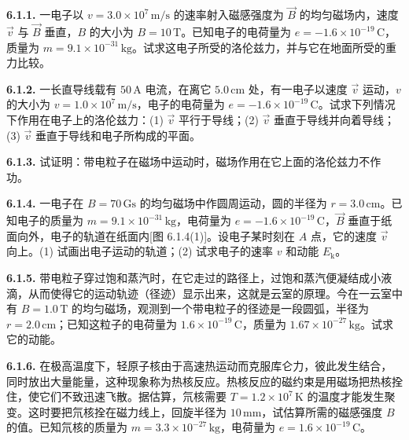 \textbf{6.1.1.} 一电子以 $v = 3.0 \times 10^{7}\,\mathrm{m/s}$ 的速率射入磁感强度为 $\vec{B}$ 的均匀磁场内，速度 $\vec{v}$ 与 $\vec{B}$ 垂直，$B$ 的大小为 $B = 10\,\mathrm{T}$。已知电子的电荷量为 $e = -1.6 \times 10^{-19}\,\mathrm{C}$，质量为 $m = 9.1 \times 10^{-31}\,\mathrm{kg}$。试求这电子所受的洛伦兹力，并与它在地面所受的重力比较。

\vfill
\newpage

\textbf{6.1.2.} 一长直导线载有 $50\,\mathrm{A}$ 电流，在离它 $5.0\,\mathrm{cm}$ 处，有一电子以速度 $\vec{v}$ 运动，$v$ 的大小为 $v = 1.0 \times 10^{7}\,\mathrm{m/s}$，电子的电荷量为 $e = -1.6 \times 10^{-19}\,\mathrm{C}$。试求下列情况下作用在电子上的洛伦兹力：(1) $\vec{v}$ 平行于导线；(2) $\vec{v}$ 垂直于导线并向着导线；(3) $\vec{v}$ 垂直于导线和电子所构成的平面。

\vfill
\newpage

\textbf{6.1.3.} 试证明：带电粒子在磁场中运动时，磁场作用在它上面的洛伦兹力不作功。

\vfill
\newpage

\textbf{6.1.4.} 一电子在 $B = 70\,\mathrm{Gs}$ 的均匀磁场中作圆周运动，圆的半径为 $r = 3.0\,\mathrm{cm}$。已知电子的质量为 $m = 9.1 \times 10^{-31}\,\mathrm{kg}$，电荷量为 $e = -1.6 \times 10^{-19}\,\mathrm{C}$，$\vec{B}$ 垂直于纸面向外，电子的轨道在纸面内[图 6.1.4(1)]。设电子某时刻在 $A$ 点，它的速度 $\vec{v}$ 向上。(1) 试画出电子运动的轨道；(2) 试求电子的速率 $v$ 和动能 $E_{\mathrm{k}}$。

\begin{center}
\end{center}

\vfill
\newpage

\textbf{6.1.5.} 带电粒子穿过饱和蒸汽时，在它走过的路径上，过饱和蒸汽便凝结成小液滴，从而使得它的运动轨迹（径迹）显示出来，这就是云室的原理。今在一云室中有 $B = 1.0\,\mathrm{T}$ 的均匀磁场，观测到一个带电粒子的径迹是一段圆弧，半径为 $r = 2.0\,\mathrm{cm}$；已知这粒子的电荷量为 $1.6 \times 10^{-19}\,\mathrm{C}$，质量为 $1.67 \times 10^{-27}\,\mathrm{kg}$。试求它的动能。

\vfill
\newpage

\textbf{6.1.6.} 在极高温度下，轻原子核由于高速热运动而克服库仑力，彼此发生结合，同时放出大量能量，这种现象称为热核反应。热核反应的磁约束是用磁场把热核拴住，使它们不致迅速飞散。据估算，氘核需要 $T = 1.2 \times 10^{7}\,\mathrm{K}$ 的温度才能发生聚变。这时要把氘核拴在磁力线上，回旋半径为 $10\,\mathrm{mm}$，试估算所需的磁感强度 $B$ 的值。已知氘核的质量为 $m = 3.3 \times 10^{-27}\,\mathrm{kg}$，电荷量为 $e = 1.6 \times 10^{-19}\,\mathrm{C}$。

